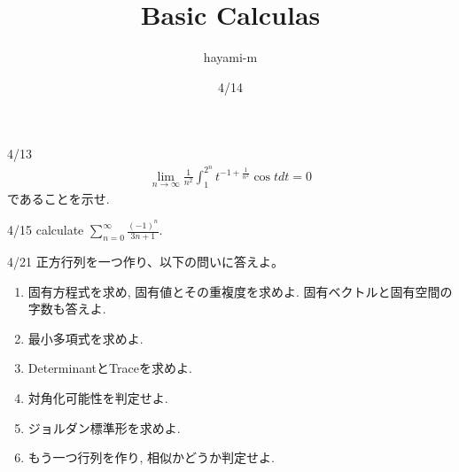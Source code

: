 \usepackage{bm}
\usepackage[dvipdfmx]{graphicx}
\usepackage{ascmac}
\usepackage{mathrsfs}
\usepackage{tikz}
\usetikzlibrary{arrows.meta}

\theoremstyle{definition}
\newtheorem{theorem}{定理}
\newtheorem{proposition}[theorem]{命題}
\newtheorem{lemma}[theorem]{補題}
\newtheorem{corollary}[theorem]{系}
\newtheorem{example}[theorem]{例}
\newtheorem{definition}[theorem]{定義}
\newtheorem{remark}[theorem]{注意}
\newtheorem{guide}[theorem]{参考}
\newtheorem{structure}[theorem]{構成}
\newtheorem{axiom}[theorem]{公理}
\newtheorem{exercise}{演習}

\DeclareMathOperator{\Ima}{Im}
\DeclareMathOperator{\Ker}{Ker}
\DeclareMathOperator{\Cok}{Cok}
\DeclareMathOperator{\Tr}{Tr}
\DeclareMathOperator{\Hom}{Hom}
\newcommand{\spanning}[2]{\text{span}\{#1\:;\:#2\}}

\everymath{\displaystyle} %



\title{Basic Calculas}
\author{hayami-m}
\date{4/14}

\maketitle

\begin{itembox}[l]{4/13}
  \begin{align*}
    \lim_{n\to\infty}\frac{1}{n^2}\int_{1}^{2^n}t^{-1+\frac{1}{n^2}}\cos{t}dt=0
  \end{align*}
  であることを示せ.
\end{itembox}

\begin{itembox}[l]{4/15}
  calculate \(\sum_{n=0}^{\infty}\frac{(-1)^n}{3n+1}\).  
\end{itembox}

\begin{itembox}[l]{4/21}
  正方行列を一つ作り、以下の問いに答えよ。
  \begin{enumerate}
    \item 固有方程式を求め, 固有値とその重複度を求めよ. 固有ベクトルと固有空間の字数も答えよ.
    \item 最小多項式を求めよ.
    \item DeterminantとTraceを求めよ.
    \item 対角化可能性を判定せよ.
    \item ジョルダン標準形を求めよ.
    \item もう一つ行列を作り, 相似かどうか判定せよ.
  \end{enumerate}
\end{itembox}

